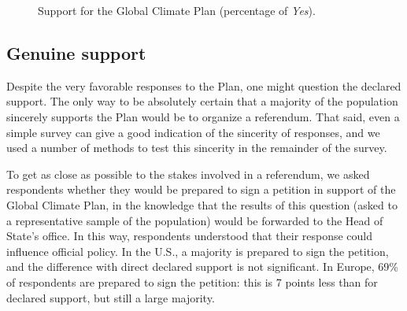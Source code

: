 \documentclass[a5paper,english,openany]{memoir}
\begin{document}
\begin{figure}[h!]
  \caption[Support for the Global Climate Plan]{Support for the Global Climate Plan (percentage of \textit{Yes}).} 
  \label{fig:gcs_support} 
\end{figure}

\subsection{Genuine support} %

Despite the very favorable responses to the Plan, one might question the declared support. 
The only way to be absolutely certain that a majority of the population sincerely supports the Plan would be to organize a referendum. That said, even a simple survey can give a good indication of the sincerity of responses, and we used a number of methods to test this sincerity in the remainder of the survey.

To get as close as possible to the stakes involved in a referendum, we asked respondents whether they would be prepared to sign a petition in support of the Global Climate Plan, in the knowledge that the results of this question (asked to a representative sample of the population) would be forwarded to the Head of State's office. In this way, respondents understood that their response could influence official policy. In the U.S., a majority is prepared to sign the petition, and the difference with direct declared support is not significant. In Europe, 69\% of respondents are prepared to sign the petition: this is 7 points less than for declared support, but still a large majority. 
\end{document}
